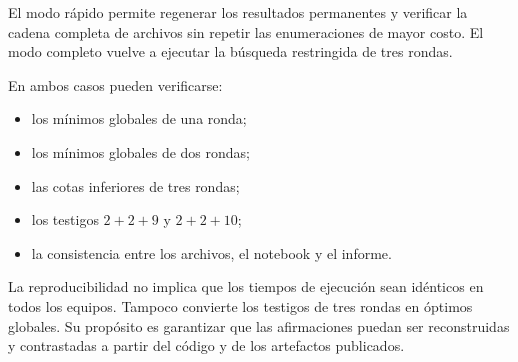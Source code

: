 El modo rápido permite regenerar los resultados permanentes y verificar la
cadena completa de archivos sin repetir las enumeraciones de mayor costo.
El modo completo vuelve a ejecutar la búsqueda restringida de tres rondas.

En ambos casos pueden verificarse:

\begin{itemize}
    \item los mínimos globales de una ronda;
    \item los mínimos globales de dos rondas;
    \item las cotas inferiores de tres rondas;
    \item los testigos $2+2+9$ y $2+2+10$;
    \item la consistencia entre los archivos, el notebook y el informe.
\end{itemize}

La reproducibilidad no implica que los tiempos de ejecución sean idénticos
en todos los equipos. Tampoco convierte los testigos de tres rondas en
óptimos globales. Su propósito es garantizar que las afirmaciones puedan
ser reconstruidas y contrastadas a partir del código y de los artefactos
publicados.